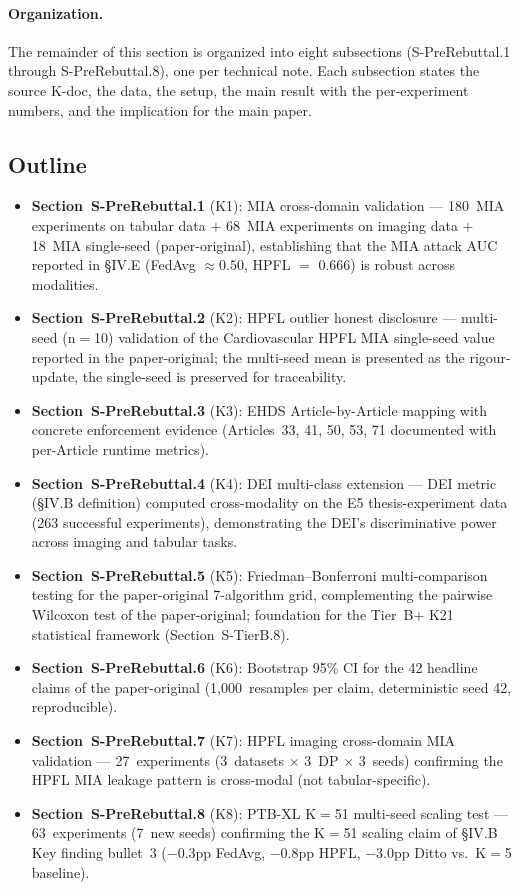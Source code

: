 \documentclass[conference]{IEEEtran}
\begin{document}
\paragraph{Organization.} The remainder of this section is organized into eight subsections (S-PreRebuttal.1 through S-PreRebuttal.8), one per technical note. Each subsection states the source K-doc, the data, the setup, the main result with the per-experiment numbers, and the implication for the main paper.

\subsection*{Outline}
\label{sec:pre_rebuttal_outline}

\begin{itemize}
\item \textbf{Section~S-PreRebuttal.1} (K1): MIA cross-domain validation --- 180~MIA experiments on tabular data $+$ 68~MIA experiments on imaging data $+$ 18~MIA single-seed (paper-original), establishing that the MIA attack AUC reported in §IV.E (FedAvg $\approx 0.50$, HPFL $=$ 0.666) is robust across modalities.
\item \textbf{Section~S-PreRebuttal.2} (K2): HPFL outlier honest disclosure --- multi-seed (n$=$10) validation of the Cardiovascular HPFL MIA single-seed value reported in the paper-original; the multi-seed mean is presented as the rigour-update, the single-seed is preserved for traceability.
\item \textbf{Section~S-PreRebuttal.3} (K3): EHDS Article-by-Article mapping with concrete enforcement evidence (Articles~33, 41, 50, 53, 71 documented with per-Article runtime metrics).
\item \textbf{Section~S-PreRebuttal.4} (K4): DEI multi-class extension --- DEI metric (§IV.B definition) computed cross-modality on the E5 thesis-experiment data (263 successful experiments), demonstrating the DEI's discriminative power across imaging and tabular tasks.
\item \textbf{Section~S-PreRebuttal.5} (K5): Friedman--Bonferroni multi-comparison testing for the paper-original 7-algorithm grid, complementing the pairwise Wilcoxon test of the paper-original; foundation for the Tier~B+ K21 statistical framework (Section~S-TierB.8).
\item \textbf{Section~S-PreRebuttal.6} (K6): Bootstrap 95\% CI for the 42 headline claims of the paper-original (1{,}000~resamples per claim, deterministic seed 42, reproducible).
\item \textbf{Section~S-PreRebuttal.7} (K7): HPFL imaging cross-domain MIA validation --- 27~experiments (3~datasets $\times$ 3~DP $\times$ 3~seeds) confirming the HPFL MIA leakage pattern is cross-modal (not tabular-specific).
\item \textbf{Section~S-PreRebuttal.8} (K8): PTB-XL K$=$51 multi-seed scaling test --- 63~experiments (7~new seeds) confirming the K$=$51 scaling claim of §IV.B Key finding bullet~3 ($-$0.3pp FedAvg, $-$0.8pp HPFL, $-$3.0pp Ditto vs.\ K$=$5 baseline).
\end{itemize}
\end{document}
